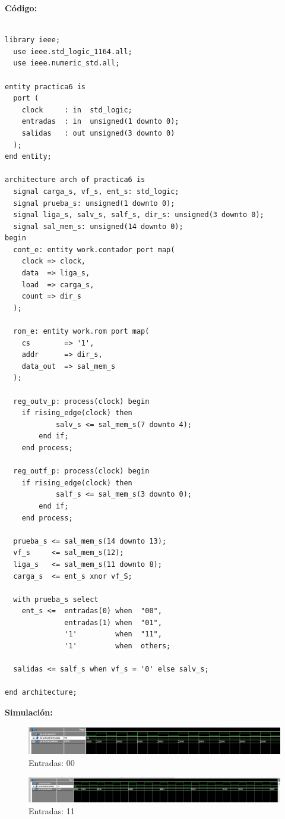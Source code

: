 \documentclass[12pt]{article}
\begin{document}
\textbf{C\'odigo:}

\begin{lstlisting}

library ieee;
  use ieee.std_logic_1164.all;
  use ieee.numeric_std.all;

entity practica6 is
  port (
    clock     : in  std_logic;
    entradas  : in  unsigned(1 downto 0);
    salidas   : out unsigned(3 downto 0)
  );
end entity;

architecture arch of practica6 is
  signal carga_s, vf_s, ent_s: std_logic;
  signal prueba_s: unsigned(1 downto 0);
  signal liga_s, salv_s, salf_s, dir_s: unsigned(3 downto 0);
  signal sal_mem_s: unsigned(14 downto 0);
begin
  cont_e: entity work.contador port map(
    clock => clock,
    data  => liga_s,
    load  => carga_s,
    count => dir_s
  );

  rom_e: entity work.rom port map(
    cs        => '1',
    addr      => dir_s,
    data_out  => sal_mem_s
  );

  reg_outv_p: process(clock) begin
    if rising_edge(clock) then
			salv_s <= sal_mem_s(7 downto 4);
		end if;
	end process;

  reg_outf_p: process(clock) begin
    if rising_edge(clock) then
			salf_s <= sal_mem_s(3 downto 0);
		end if;
	end process;

  prueba_s <= sal_mem_s(14 downto 13);
  vf_s     <= sal_mem_s(12);
  liga_s   <= sal_mem_s(11 downto 8);
  carga_s  <= ent_s xnor vf_S;

  with prueba_s select
    ent_s <=  entradas(0) when  "00",
              entradas(1) when  "01",
              '1'         when  "11",
              '1'         when  others;

  salidas <= salf_s when vf_s = '0' else salv_s;

end architecture;

\end{lstlisting}

\bigskip
\textbf{Simulaci\'on:}

\begin{figure}[H]
	\centering
	\includegraphics[width=1.0\textwidth]{input_00_imp}
	\caption{Entradas: 00}
\end{figure}

\begin{figure}[H]
	\centering
	\includegraphics[width=1.0\textwidth]{input_11_imp}
	\caption{Entradas: 11}
\end{figure}
\end{document}
